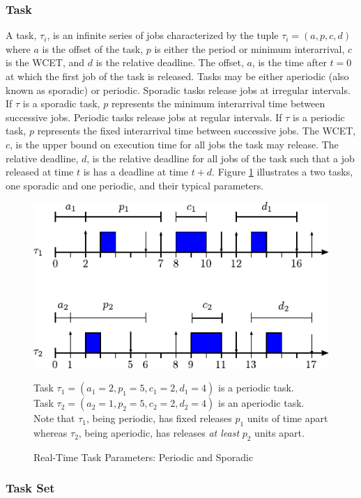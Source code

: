 \subsubsection{Task}

A task, $\tau_i$, is an infinite series of jobs characterized by the tuple $\tau_i = (a,p,c,d)$ where $a$ is the offset of the task, $p$ is either the period or minimum interarrival, $c$ is the WCET, and $d$ is the relative deadline.
The offset, $a$, is the time after $t=0$ at which the first job of the task is released.
Tasks may be either aperiodic (also known as sporadic) or periodic.
Sporadic tasks release jobs at irregular intervals.
If $\tau$ is a sporadic task, $p$ represents the minimum interarrival time between successive jobs.
Periodic tasks release jobs at regular intervals.
If $\tau$ is a periodic task, $p$ represents the fixed interarrival time between successive jobs.
The WCET, $c$, is the upper bound on execution time for all jobs the task may release.
The relative deadline, $d$, is the relative deadline for all jobs of the task such that a job released at time $t$ is has a deadline at time $t+d$.
Figure \ref{fig:rt-task} illustrates a two tasks, one sporadic and one periodic, and their typical parameters.

\begin{figure}[!htbp]
    \centering
    \includegraphics[width=0.75\linewidth]{fig/taskParameters.pdf}
    \caption{Real-Time Task Parameters: Periodic and Sporadic}
    Task $\tau_1 = (a_1=2, p_1 = 5, c_1=2, d_1=4)$ is a periodic task.\\
    Task $\tau_2 = (a_2=1,p_2=5,c_2=2,d_2=4)$ is an aperiodic task.\\
    Note that $\tau_1$, being periodic, has fixed releases $p_1$ units of time apart whereas $\tau_2$, being aperiodic, has releases \textit{at least} $p_2$ units apart.
    \label{fig:rt-task}
\end{figure}

\subsubsection{Task Set}

